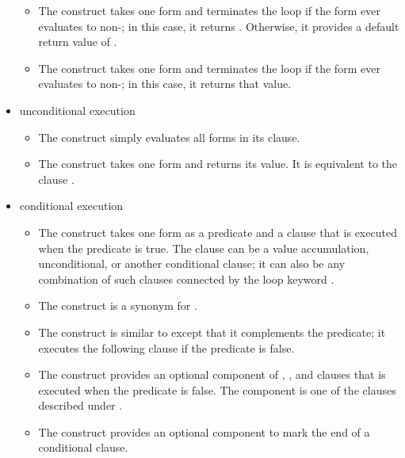 \begin{itemize}
\begin{itemize}
  \item
  The  construct takes one form and terminates the loop
  if the form ever evaluates to non-; in this case, it returns
  .  Otherwise, it provides a default return value of .

  \item
  The  construct takes one form and terminates the loop
  if the form ever evaluates to non-; in this case, it returns
  that value.
  \end{itemize}

  \item unconditional execution

  \begin{itemize}
  \item
  The  construct simply evaluates all forms in its clause.

  \item
  The  construct takes one form and returns its value.  It is 
  equivalent to the clause .
  \end{itemize}

  \item conditional execution

  \begin{itemize}
  \item
  The  construct takes one form as a predicate and a clause that 
  is executed when the predicate is true. The clause can be a value 
  accumulation, unconditional, or another conditional clause; it can also
  be any combination of such clauses connected by the loop keyword .

  \item
  The  construct is a synonym for .

  \item
  The  construct is similar to  except that it complements
  the predicate; it executes the following clause if the predicate is false.

  \item
  The  construct provides an optional component of ,
  , and  clauses that is executed when the
  predicate is false.  The component is one of the clauses described under
  .

  \item
  The  construct provides an optional component to mark the
  end of a conditional clause.
  \end{itemize}


\end{itemize}
